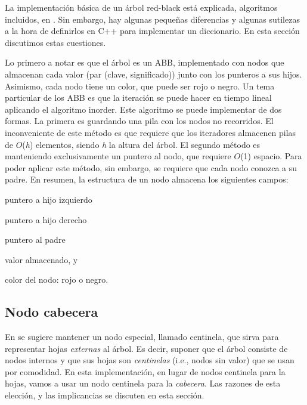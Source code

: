 La implementación básica de un árbol red-\/black está explicada, algoritmos incluidos, en \cite{CormenLeisersonRivestStein2009}. Sin embargo, hay algunas pequeñas diferencias y algunas sutilezas a la hora de definirlos en C++ para implementar un diccionario. En esta sección discutimos estas cuestiones.

Lo primero a notar es que el árbol es un A\+BB, implementado con nodos que almacenan cada valor (par {\ttfamily (clave, significado)}) junto con los punteros a sus hijos. Asimismo, cada nodo tiene un color, que puede ser rojo o negro. Un tema particular de los A\+BB es que la iteración se puede hacer en tiempo lineal aplicando el algoritmo inorder. Este algoritmo se puede implementar de dos formas. La primera es guardando una pila con los nodos no recorridos. El inconveniente de este método es que requiere que los iteradores almacenen pilas de $O$({\itshape h}) elementos, siendo {\itshape h} la altura del árbol. El segundo método es manteniendo exclusivamente un puntero al nodo, que requiere $O$(1) espacio. Para poder aplicar este método, sin embargo, se requiere que cada nodo conozca a su padre. En resumen, la estructura de un nodo almacena los siguientes campos\+:
\begin{DoxyItemize}
\item puntero a hijo izquierdo
\item puntero a hijo derecho
\item puntero al padre
\item valor almacenado, y
\item color del nodo\+: rojo o negro.
\end{DoxyItemize}\hypertarget{Implementacion_Cabecera}{}\subsection{Nodo cabecera}\label{Implementacion_Cabecera}
En \cite{CormenLeisersonRivestStein2009} se sugiere mantener un nodo especial, llamado centinela, que sirva para representar hojas {\itshape externas} al árbol. Es decir, suponer que el árbol consiste de nodos internos y que sus hojas son {\itshape centinelas} (i.\+e., nodos sin valor) que se usan por comodidad. En esta implementación, en lugar de nodos centinela para la hojas, vamos a usar un nodo centinela para la {\itshape cabecera}. Las razones de esta elección, y las implicancias se discuten en esta sección.

